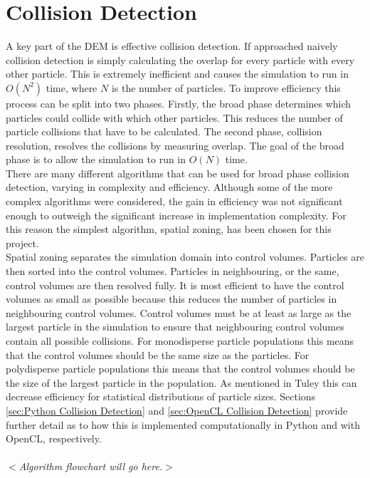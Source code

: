 \documentclass[10pt,a4paper,titlepage]{report}
\begin{document}
\section{Collision Detection}
\label{sec:collision detection}
A key part of the DEM is effective collision detection. If approached naively collision detection is simply calculating the overlap for every particle with every other particle. This is extremely inefficient and causes the simulation to run in $O(N^2)$ time, where $N$ is the number of particles. To improve efficiency this process can be split into two phases. Firstly, the broad phase determines which particles could collide with which other particles. This reduces the number of particle collisions that have to be calculated. The second phase, collision resolution, resolves the collisions by measuring overlap. The goal of the broad phase is to allow the simulation to run in $O(N)$ time.
\\There are many different algorithms that can be used for broad phase collision detection, varying in complexity and efficiency. Although some of the more complex algorithms were considered, the gain in efficiency was not significant enough to outweigh the significant increase in implementation complexity. For this reason the simplest algorithm, spatial zoning, has been chosen for this project.
\\Spatial zoning separates the simulation domain into control volumes. Particles are then sorted into the control volumes. Particles in neighbouring, or the same, control volumes are then resolved fully. It is most efficient to have the control volumes as small as possible because this reduces the number of particles in neighbouring control volumes. Control volumes must be at least as large as the largest particle in the simulation to ensure that neighbouring control volumes contain all possible collisions. For monodisperse particle populations this means that the control volumes should be the same size as the particles. For polydisperse particle populations this means that the control volumes should be the size of the largest particle in the population. As mentioned in Tuley\cite{tuley} this can decrease efficiency for statistical distributions of particle sizes. Sections \ref{sec:Python Collision Detection} and \ref{sec:OpenCL Collision Detection} provide further detail as to how this is implemented computationally in Python and with OpenCL, respectively.
\\\\$<$\textit{Algorithm flowchart will go here.}$>$
\end{document}
